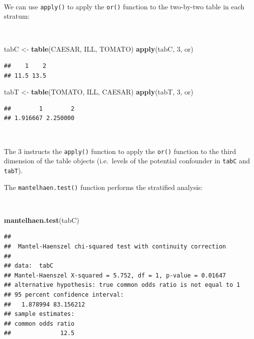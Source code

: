 \documentclass[12pt,a4paper]{book}
\newenvironment{Shaded}{\begin{snugshade}}{\end{snugshade}}
\newcommand{\KeywordTok}[1]{\textcolor[rgb]{0.13,0.29,0.53}{\textbf{#1}}}
\newcommand{\DecValTok}[1]{\textcolor[rgb]{0.00,0.00,0.81}{#1}}
\newcommand{\StringTok}[1]{\textcolor[rgb]{0.31,0.60,0.02}{#1}}
\newcommand{\NormalTok}[1]{#1}
\theoremstyle{definition}
\theoremstyle{definition}
\theoremstyle{definition}
\theoremstyle{remark}
\begin{document}
~

We can use \texttt{apply()} to apply the \texttt{or()} function to the
two-by-two table in each stratum:

~

\begin{Shaded}
\begin{Highlighting}[]
\NormalTok{tabC <-}\StringTok{ }\KeywordTok{table}\NormalTok{(CAESAR, ILL, TOMATO)}
\KeywordTok{apply}\NormalTok{(tabC, }\DecValTok{3}\NormalTok{, or)}
\end{Highlighting}
\end{Shaded}

\begin{verbatim}
##    1    2 
## 11.5 13.5
\end{verbatim}

\begin{Shaded}
\begin{Highlighting}[]
\NormalTok{tabT <-}\StringTok{ }\KeywordTok{table}\NormalTok{(TOMATO, ILL, CAESAR)}
\KeywordTok{apply}\NormalTok{(tabT, }\DecValTok{3}\NormalTok{, or)}
\end{Highlighting}
\end{Shaded}

\begin{verbatim}
##        1        2 
## 1.916667 2.250000
\end{verbatim}

~

The 3 instructs the \texttt{apply()} function to apply the \texttt{or()}
function to the third dimension of the table objects (i.e.~levels of the
potential confounder in \texttt{tabC} and \texttt{tabT}).

The \texttt{mantelhaen.test()} function performs the stratified
analysis:

~

\begin{Shaded}
\begin{Highlighting}[]
\KeywordTok{mantelhaen.test}\NormalTok{(tabC)}
\end{Highlighting}
\end{Shaded}

\begin{verbatim}
## 
##  Mantel-Haenszel chi-squared test with continuity correction
## 
## data:  tabC
## Mantel-Haenszel X-squared = 5.752, df = 1, p-value = 0.01647
## alternative hypothesis: true common odds ratio is not equal to 1
## 95 percent confidence interval:
##   1.878994 83.156212
## sample estimates:
## common odds ratio 
##              12.5
\end{verbatim}
\end{document}
